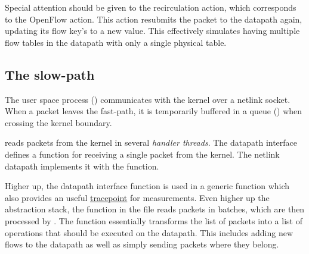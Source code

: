 Special attention should be given to the recirculation action, which corresponds to the  OpenFlow action. This action resubmits the packet to the datapath again, updating its flow key's  to a new value. This effectively simulates having multiple flow tables in the datapath with only a single physical table.


\subsection{The slow-path}

The user space process (\href{https://www.man7.org/linux/man-pages/man8/ovs-vswitchd.8.html}{}) communicates with the kernel over a netlink socket. When a packet leaves the
fast-path, it is temporarily buffered in a queue (\href{https://elixir.bootlin.com/linux/v6.2.6/source/net/openvswitch/datapath.c\#L311}{}) when crossing the kernel boundary.

 reads packets from the kernel in several \emph{handler threads}. The datapath interface defines a \href{https://github.com/openvswitch/ovs/blob/e90a0727f17f6ad915a32735a8c0b282f2c8cd6f/lib/dpif-provider.h\#L387-L408}{} function for receiving a single packet from the kernel. The netlink datapath implements it with the \href{https://github.com/openvswitch/ovs/blob/e90a0727f17f6ad915a32735a8c0b282f2c8cd6f/lib/dpif-netlink.c\#L3132-L3134}{} function.

Higher up, the  datapath interface function is used in a generic \href{https://github.com/openvswitch/ovs/blob/e90a0727f17f6ad915a32735a8c0b282f2c8cd6f/lib/dpif.c\#L1591-L1611}{} function which also provides an useful \href{https://github.com/openvswitch/ovs/blob/e90a0727f17f6ad915a32735a8c0b282f2c8cd6f/lib/dpif.c\#L1618}{tracepoint} for measurements. Even higher up the abstraction stack, the \href{https://github.com/openvswitch/ovs/blob/e90a0727f17f6ad915a32735a8c0b282f2c8cd6f/ofproto/ofproto-dpif-upcall.c\#L829-L830}{} function in the file  reads packets in batches, which are then processed by \href{https://github.com/openvswitch/ovs/blob/e90a0727f17f6ad915a32735a8c0b282f2c8cd6f/ofproto/ofproto-dpif-upcall.c\#L1639-L1641}{}. The  function essentially transforms the list of packets into a list of operations that should be executed on the datapath. This includes adding new flows to the datapath as well as simply sending packets where they belong.

